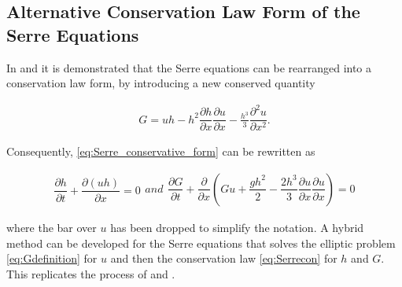\documentclass[SingleSpace,12pt,Proceedings]{Serre_ASCE}
\begin{document}
\subsection{Alternative Conservation Law Form of the Serre Equations}
\label{section:Alternative Conservation Law Form of the Serre Equations}
In  and  it is demonstrated that the Serre equations can be rearranged into a conservation law form, by introducing a new conserved quantity
\begin{linenomath*}
\begin{gather}
\label{eq:Gdefinition}
G = uh - h^2 \dfrac{\partial h}{\partial x} \dfrac{\partial u}{\partial x} - \frac{h^3}{3} \dfrac{\partial^2 u}{\partial x^2}.
\end{gather}
\end{linenomath*}
Consequently, \eqref{eq:Serre_conservative_form} can be rewritten as
\begin{linenomath*}
\begin{subequations}
\begin{gather}
\dfrac{\partial h}{\partial t} + \dfrac{\partial (uh)}{\partial x} = 0
\label{eq:Serrecon_continuity}
\end{gather}
and
\begin{gather}
\dfrac{\partial G}{\partial t} + \dfrac{\partial}{\partial x}\left(Gu + \dfrac{gh^2}{2} - \dfrac{2h^3}{3}\dfrac{\partial u}{\partial x}\dfrac{\partial u}{\partial x}\right) = 0
\label{eq:Serrecon_momentum}
\end{gather}
\label{eq:Serrecon}
\end{subequations}
\end{linenomath*}
where the bar over $u$ has been dropped to simplify the notation. A hybrid method can be developed for the Serre equations that solves the elliptic problem \eqref{eq:Gdefinition} for $u$ and then the conservation law \eqref{eq:Serrecon} for $h$ and $G$. This replicates the process of  and .
\end{document}
